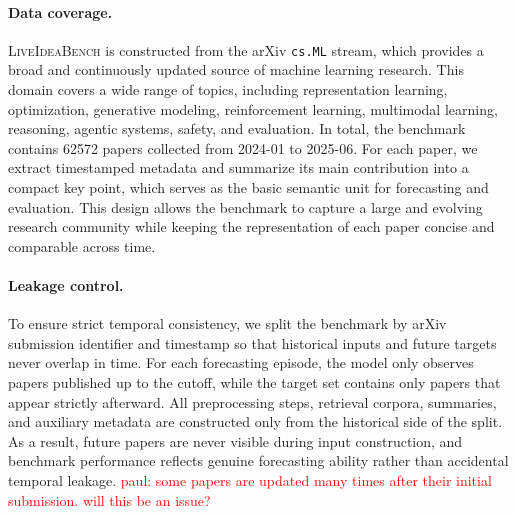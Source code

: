 \documentclass{article} %
\newcommand{\paul}[1]{\textcolor{red}{paul: #1}}
\begin{document}
\paragraph{Data coverage.}
\textsc{LiveIdeaBench} is constructed from the arXiv \texttt{cs.ML} stream, which provides a broad and continuously updated source of machine learning research. This domain covers a wide range of topics, including representation learning, optimization, generative modeling, reinforcement learning, multimodal learning, reasoning, agentic systems, safety, and evaluation. In total, the benchmark contains 62572 papers collected from 2024-01 to 2025-06. For each paper, we extract timestamped metadata and summarize its main contribution into a compact key point, which serves as the basic semantic unit for forecasting and evaluation. This design allows the benchmark to capture a large and evolving research community while keeping the representation of each paper concise and comparable across time.

\paragraph{Leakage control.}
To ensure strict temporal consistency, we split the benchmark by arXiv submission identifier and timestamp so that historical inputs and future targets never overlap in time. For each forecasting episode, the model only observes papers published up to the cutoff, while the target set contains only papers that appear strictly afterward. All preprocessing steps, retrieval corpora, summaries, and auxiliary metadata are constructed only from the historical side of the split. As a result, future papers are never visible during input construction, and benchmark performance reflects genuine forecasting ability rather than accidental temporal leakage. \paul{some papers are updated many times after their initial submission. will this be an issue?}
\end{document}
